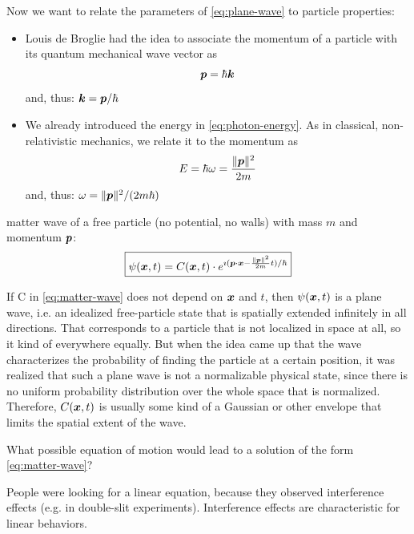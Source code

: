 Now we want to relate the parameters of \eqref{eq:plane-wave} to particle properties:
\begin{itemize}
\item 
Louis de Broglie had the idea to associate the momentum of a particle with its quantum mechanical wave vector as
\[
{\boldsymbol{p}} = \hbar {\boldsymbol{k}}
\]
and, thus:
\(
{\boldsymbol{k}} = {\boldsymbol{p}} / \hbar
\)
\item 
We already introduced the energy in \eqref{eq:photon-energy}.
As in classical, non-relativistic mechanics, we relate it to the momentum as
\[
E = \hbar \omega = \frac{\|{\boldsymbol{p}}\|^2}{2m}
\]
and, thus: 
\(
\omega = \|{\boldsymbol{p}}\|^2 / (2 m \hbar)
\)
\end{itemize}

\medskip

matter wave of a free particle (no potential, no walls) with mass $m$ and momentum ${\boldsymbol{p}}$:
\begin{equation}\label{eq:matter-wave}
\boxed{
\psi({\boldsymbol{x}}, t) = C({\boldsymbol{x}}, t) \cdot e^{\imath ({\boldsymbol{p}} \cdot {\boldsymbol{x}} - \frac{\|{\boldsymbol{p}}\|^2}{2 m} t)/\hbar}
}
\end{equation}

\begin{remark}
If C in \eqref{eq:matter-wave} does not depend on ${\boldsymbol{x}}$ and $t$, then $\psi({\boldsymbol{x}}, t)$ is a plane wave, i.e. an idealized free-particle state that is spatially extended infinitely in all directions.
That corresponds to a particle that is not localized in space at all, so it kind of everywhere equally.
But when the idea came up that the wave characterizes the probability of finding the particle at a certain position, it was realized that such a plane wave is not a normalizable physical state, since there is no uniform probability distribution over the whole space that is normalized.
Therefore, $C({\boldsymbol{x}}, t)$ is usually some kind of a Gaussian or other envelope that limits the spatial extent of the wave.
\end{remark}


What possible equation of motion would lead to a solution of the form \eqref{eq:matter-wave}?

People were looking for a linear equation, because they observed interference effects (e.g. in double-slit experiments).
Interference effects are characteristic for linear behaviors.


